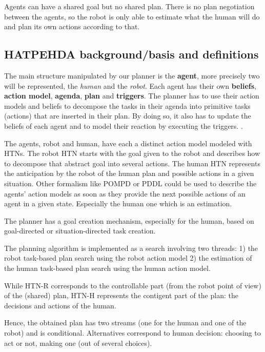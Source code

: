 \documentclass[letterpaper]{article} %
\begin{document}
Agents can have a shared goal but no shared plan. There is no plan negotiation between the agents, so the robot is only able to estimate what the human will do and plan its own actions according to that.

\subsection{HATPEHDA background/basis and definitions}

The main structure manipulated by our planner is the \textbf{agent}, more precisely two will be represented, the \textit{human} and the \textit{robot}. Each agent has their own \textbf{beliefs}, \textbf{action model}, \textbf{agenda}, \textbf{plan} and \textbf{triggers}. The planner has to use their action models and beliefs to decompose the tasks in their agenda into primitive tasks (actions) that are inserted in their plan. By doing so, it also has to update the beliefs of each agent and to model their reaction by executing the triggers. \cite{buisan:hal-03684211}.

The agents, robot and human, have each a distinct action model modeled with HTNs. The robot HTN starts with the goal given to the robot and describes how to decompose that abstract goal into several actions. The human HTN represents the anticipation by the robot of the human plan and possible actions in a given situation. Other formalism like POMPD or PDDL could be used to describe the agents' action models as soon as they provide the next possible actions of an agent in a given state. Especially the human one which is an estimation.

The planner has a goal creation mechanism, especially for the human, based on goal-directed or situation-directed task creation.

The planning algorithm is implemented as a search involving two threads: 1) the robot task-based plan search using the robot action model 2) the estimation of the human task-based plan search using the human action model.

While HTN-R corresponds to the controllable part  (from the robot point of view) of the (shared) plan, HTN-H represents the contigent part of the plan: the decisions and actions of the human. 

Hence, the obtained plan has two streams (one for the human and one of the robot) and is conditional. Alternatives correspond to human decision: choosing to act or not, making one (out of several choices).
\end{document}
